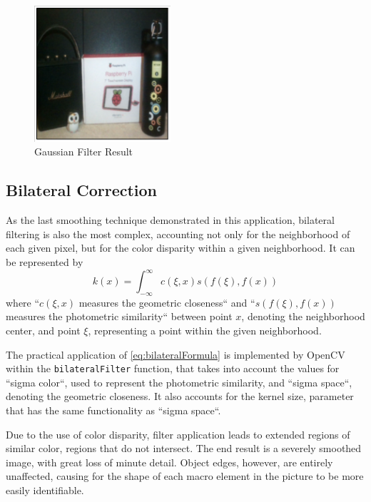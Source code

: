 \begin{figure}[H]
	\includegraphics[width=0.45\textwidth, height=0.45\textwidth]{resources/Gaussian_2.png}
	\caption{Gaussian Filter Result}
\end{figure}

\subsection{Bilateral Correction}

As the last smoothing technique demonstrated in this application, bilateral filtering is also the most
complex, accounting not only for the neighborhood of each given pixel, but for the color disparity within
a given neighborhood. It can be represented \cite{bilateral} by
\begin{equation}
	\label{eq:bilateralFormula}
	k(x) = \int_{-\infty}^{\infty} c(\xi, x) s(f(\xi), f(x))
\end{equation}
where ``\(c(\xi, x)\) measures the geometric closeness`` and ``\(s(f(\xi), f(x))\) measures the photometric
similarity`` between point \(x\), denoting the neighborhood center, and point \(\xi\), representing a point
within the given neighborhood. \cite{bilateral}

The practical application of \cref{eq:bilateralFormula} is implemented by OpenCV within the
\verb|bilateralFilter| function, that takes into account the values for ``sigma color``, used to represent
the photometric similarity, and ``sigma space``, denoting the geometric closeness. It also accounts for the
kernel size, parameter that has the same functionality as ``sigma space``. \cite{opencvImproc}

Due to the use of color disparity, filter application leads to extended regions of similar color, regions that
do not intersect. The end result is a severely smoothed image, with great loss of minute detail. Object edges,
however, are entirely unaffected, causing for the shape of each macro element in the picture to be more easily
identifiable.

